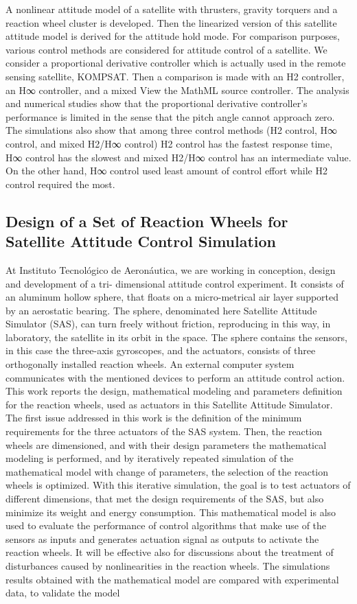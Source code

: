 A nonlinear attitude model of a satellite with thrusters, gravity torquers and a reaction wheel cluster is developed. Then the linearized version of this satellite attitude model is derived for the attitude hold mode. For comparison purposes, various control methods are considered for attitude control of a satellite. We consider a proportional derivative controller which is actually used in the remote sensing satellite, KOMPSAT. Then a comparison is made with an H2 controller, an H∞ controller, and a mixed View the MathML source controller. The analysis and numerical studies show that the proportional derivative controller's performance is limited in the sense that the pitch angle cannot approach zero. The simulations also show that among three control methods (H2 control, H∞ control, and mixed H2/H∞ control) H2 control has the fastest response time, H∞ control has the slowest and mixed H2/H∞ control has an intermediate value. On the other hand, H∞ control used least amount of control effort while H2 control required the most.


\subsection{Design
of
a Set of Reaction Wheels for Satellite Attitude Control Simulation}

At
Instituto
Tecnológico de Aeronáutica, we are working in conception, design and development of a tri-
dimensional attitude control experiment. It consists of an aluminum hollow sphere, that floats on a micro-metrical air
layer supported by an aerostatic bearing. The sphere, denominated here Satellite Attitude Simulator (SAS), can turn
freely without friction, reproducing in this way, in laboratory, the satellite in its orbit in the space. The sphere contains
the sensors, in this case the three-axis gyroscopes, and the actuators, consists of three orthogonally installed reaction
wheels. An external computer system communicates with the mentioned devices to perform an attitude control action.
This work reports the design, mathematical modeling and parameters definition for the reaction wheels, used as actuators
in this Satellite Attitude Simulator. The first issue addressed in this work is the definition of the minimum requirements for
the three actuators of the SAS system. Then, the reaction wheels are dimensioned, and with their design parameters the
mathematical modeling is performed, and by iteratively repeated simulation of the mathematical model with change of
parameters, the selection of the reaction wheels is optimized. With this iterative simulation, the goal is to test actuators of
different dimensions, that met the design requirements of the SAS, but also minimize its weight and energy consumption.
This mathematical model is also used to evaluate the performance of control algorithms that make use of the sensors as
inputs and generates actuation signal as outputs to activate the reaction wheels. It will be effective also for discussions
about the treatment of disturbances caused by nonlinearities in the reaction wheels. The simulations results obtained with
the mathematical model are compared with experimental data, to validate the model



